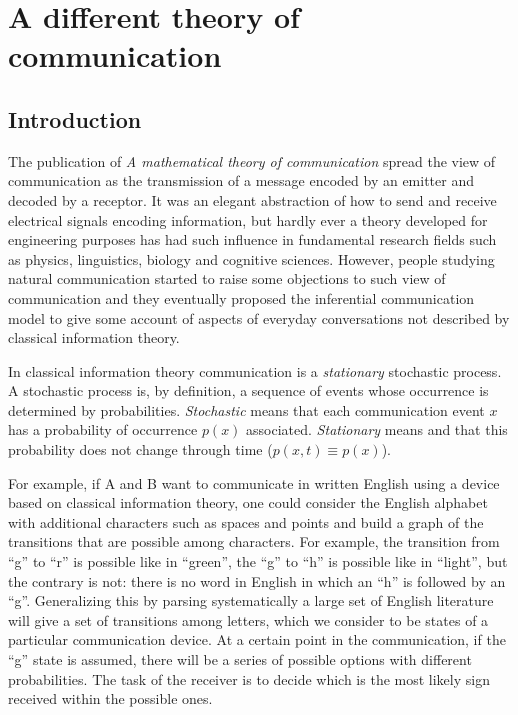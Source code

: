 \documentclass[
		twoside,openright,titlepage,numbers=noenddot,manychapters,
		headinclude,%
                footinclude=false,cleardoublepage=empty,
                BCOR=5mm,
		fontsize=11pt, %
                 enabledeprecatedfontcommands]{scrreprt}
\begin{document}
\section{A different theory of communication}

\subsection{Introduction}

The publication of  \emph{A mathematical theory of communication} \cite[]{shannon48} spread the view of communication as the transmission of a message encoded by an emitter and decoded by a receptor. It was an elegant abstraction of how to send and receive electrical signals encoding information, but hardly ever a theory developed for engineering purposes has had such influence in fundamental research fields such as physics, linguistics, biology and cognitive sciences.  However, people studying natural communication started to raise some objections to such view of communication and they eventually proposed the inferential communication model to give some account of aspects of everyday conversations not described by classical information theory. 

 In classical information theory communication is a \emph{stationary} stochastic process. A stochastic process is, by definition, a sequence of events whose occurrence is determined by probabilities. \emph{Stochastic} means that each communication event $x$ has a probability of occurrence $p(x)$  associated. \emph{Stationary} means and that this probability does not change through time ($p(x,t) \equiv p(x)$).

 For example, if A and B want to communicate in written English using a device based on classical information theory, one could consider the English alphabet with additional characters such as spaces and points and build a graph of the transitions that are possible among characters. For example, the transition from ``g'' to ``r'' is possible like in ``green'', the ``g'' to ``h'' is possible like in ``light'', but the contrary is not: there is no word in English in which an ``h'' is followed by an ``g''. Generalizing this by parsing systematically a large set of English literature will give a set of transitions among letters, which we consider to be states of a particular communication device. At a certain point in the communication, if the ``g'' state is assumed, there will be a series of possible options with different probabilities. The task of the receiver is to decide which is the most likely sign received within the possible ones.
\end{document}
